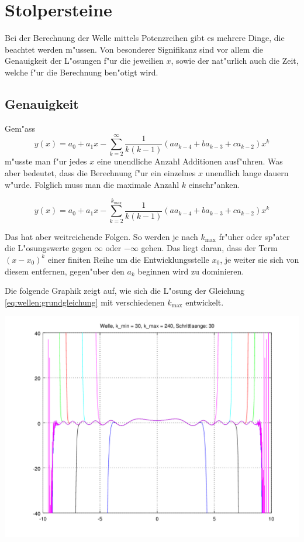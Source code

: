 \section{Stolpersteine}

Bei der Berechnung der Welle mittels Potenzreihen gibt es mehrere Dinge, die 
beachtet werden m"ussen. Von besonderer Signifikanz sind vor allem die 
Genauigkeit der L"osungen f"ur die jeweilien $x$, sowie der nat"urlich auch die 
Zeit, welche f"ur die Berechnung ben"otigt wird.


\subsection{Genauigkeit}
Gem"ass
\begin{equation*}
	y(x) = a_0 + a_1x 
	-\sum_{k=2}^{\infty}\frac{1}{k(k-1)}(aa_{k-4}+ba_{k-3}+ca_{k-2})x^k
\end{equation*}
m"usste man f"ur jedes $x$ eine unendliche Anzahl Additionen ausf"uhren. Was 
aber bedeutet, dass die Berechnung f"ur ein einzelnes $x$ unendlich lange 
dauern w"urde. Folglich muss man die maximale Anzahl $k$ einschr"anken.

\begin{equation*}
	y(x) = a_0 + a_1x 
	-\sum_{k=2}^{k_{\text{max}}}\frac{1}{k(k-1)}(aa_{k-4}+ba_{k-3}+ca_{k-2})x^k
\end{equation*}

Das hat aber weitreichende Folgen. So werden je nach $k_{\text{max}}$ fr"uher 
oder sp"ater die L"osungswerte gegen $\infty$ oder $-\infty$ gehen. Das liegt 
daran, dass der Term $(x - x_0)^k$ einer finiten Reihe um die 
Entwicklungsstelle $x_0$, je weiter sie sich von diesem entfernen, gegen"uber 
den $a_k$ beginnen wird zu dominieren.

Die folgende Graphik zeigt auf, wie sich die L"osung der Gleichung 
\ref{eq:wellen:grundgleichung} mit verschiedenen $k_{\text{max}}$ entwickelt.

\begin{center}
	\includegraphics[scale=0.65]{./wellen/images/kmax/krangewaveeven.png}
\end{center}

